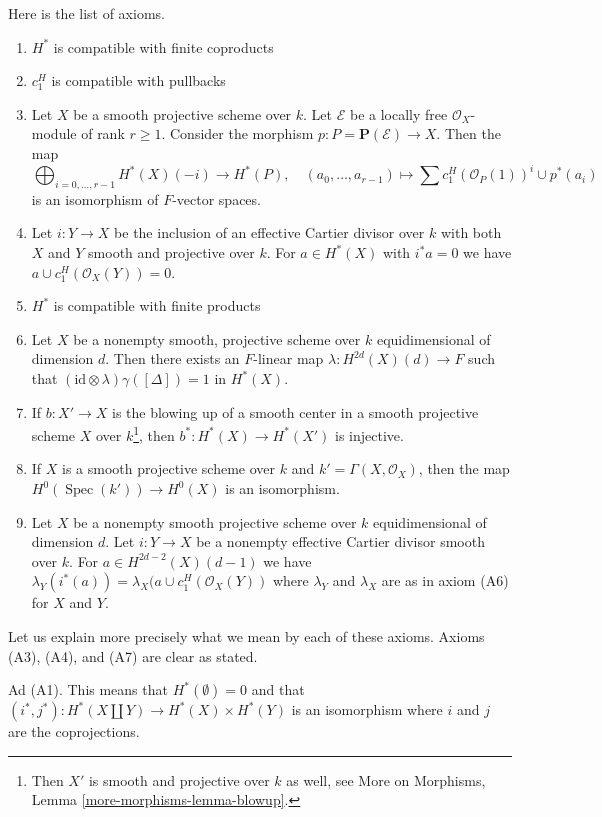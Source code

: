 \documentclass{stacks-project}
\theoremstyle{plain}
\theoremstyle{definition}
\theoremstyle{remark}
\numberwithin{equation}{subsection}
\def\Spec{\mathop{\mathrm{Spec}}}
\begin{document}
\medskip\noindent
Here is the list of axioms.
\begin{enumerate}
\item[(A1)] $H^*$ is compatible with finite coproducts
\item[(A2)] $c_1^H$ is compatible with pullbacks
\item[(A3)] Let $X$ be a smooth projective scheme over $k$.
Let $\mathcal{E}$ be a locally free $\mathcal{O}_X$-module of rank $r \geq 1$.
Consider the morphism $p : P = \mathbf{P}(\mathcal{E}) \to X$.
Then the map
$$
\bigoplus\nolimits_{i = 0, \ldots, r - 1} H^*(X)(-i)
\longrightarrow H^*(P),\quad
(a_0, \ldots, a_{r - 1}) \longmapsto
\sum c_1^H(\mathcal{O}_P(1))^i \cup p^*(a_i)
$$
is an isomorphism of $F$-vector spaces.
\item[(A4)] Let $i : Y \to X$ be the inclusion of an effective
Cartier divisor over $k$ with both $X$ and $Y$ smooth and projective
over $k$. For $a \in H^*(X)$ with
$i^*a = 0$ we have $a \cup c_1^H(\mathcal{O}_X(Y)) = 0$.
\item[(A5)] $H^*$ is compatible with finite products
\item[(A6)] Let $X$ be a nonempty smooth, projective scheme over $k$
equidimensional of dimension $d$. Then there exists an
$F$-linear map $\lambda : H^{2d}(X)(d) \to F$ such that
$(\text{id} \otimes \lambda) \gamma([\Delta]) =  1$ in $H^*(X)$.
\item[(A7)] If $b : X' \to X$ is the blowing up of a smooth
center in a smooth projective scheme $X$ over $k$\footnote{Then $X'$ is
smooth and projective over $k$ as well, see
More on Morphisms, Lemma \ref{more-morphisms-lemma-blowup}.}, then
$b^* : H^*(X) \to H^*(X')$ is injective.
\item[(A8)] If $X$ is a smooth projective scheme over $k$ and
$k' = \Gamma(X, \mathcal{O}_X)$, then the map $H^0(\Spec(k')) \to H^0(X)$
is an isomorphism.
\item[(A9)] Let $X$ be a nonempty smooth projective scheme over $k$
equidimensional of dimension $d$. Let $i : Y \to X$ be a nonempty
effective Cartier divisor smooth over $k$. For $a \in H^{2d - 2}(X)(d - 1)$
we have $\lambda_Y(i^*(a)) = \lambda_X(a \cup c_1^H(\mathcal{O}_X(Y))$ where
$\lambda_Y$ and $\lambda_X$ are as in axiom (A6) for $X$ and $Y$.
\end{enumerate}
Let us explain more precisely what we mean by each of these axioms.
Axioms (A3), (A4), and (A7) are clear as stated.

\medskip\noindent
Ad (A1). This means that $H^*(\emptyset) = 0$ and that
$(i^*, j^*) : H^*(X \amalg Y) \to H^*(X) \times H^*(Y)$
is an isomorphism where $i$ and $j$ are the coprojections.
\end{document}

